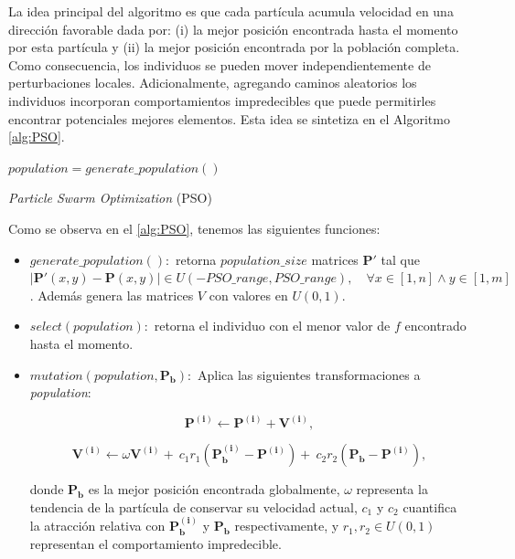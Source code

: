 La idea principal del algoritmo es que cada partícula acumula 
velocidad en una dirección favorable dada por: 
(i) la mejor posición encontrada hasta el momento por esta partícula y 
(ii) la mejor posición encontrada por la población completa.
Como consecuencia, los individuos se pueden mover independientemente de
perturbaciones locales.
Adicionalmente, agregando caminos aleatorios los individuos incorporan
comportamientos impredecibles que puede permitirles encontrar potenciales
mejores elementos. Esta idea se sintetiza en el Algoritmo \ref{alg:PSO}.

\begin{algorithm}
{}
$population = generate\_population()$ \\
\caption{\emph{Particle Swarm Optimization} (PSO)}
\label{alg:PSO}
\end{algorithm}

Como se observa en el \autoref{alg:PSO}, tenemos las siguientes funciones:

\begin{itemize}

    \item $generate\_population():$ 
      retorna $population\_size$ matrices 
      $\boldsymbol{P'}$ tal que 
      $|\boldsymbol{P'}(x, y) - \boldsymbol{P}(x, y)| \in U(-PSO\_range, PSO\_range), \quad \forall x \in [1, n]
      \land y \in [1, m]$. Además genera las matrices $V$ con valores en $U(0, 1)$.

\item $select(population):$ retorna el individuo con el menor valor de $f$ encontrado hasta el momento.

\item $mutation(population, \boldsymbol{P_b}):$ Aplica las siguientes transformaciones a \emph{population}: 
    
  \begin{equation}
    \boldsymbol{P^{(i)}} \gets \boldsymbol{P^{(i)}} + \boldsymbol{V^{(i)}},
  \label{pso-pos}
  \end{equation}

  \begin{equation}
    \boldsymbol{V^{(i)}} \gets \omega \boldsymbol{V^{(i)}} + \
                          c_1 r_1 \left(\boldsymbol{P_{b}^{(i)}} - \boldsymbol{P^{(i)}} \right) + \
                          c_2 r_2 \left(\boldsymbol{P_{b}} - \boldsymbol{P^{(i)}} \right),
  \label{pso-speed}
  \end{equation}
    

  donde $\boldsymbol{P_{b}}$  es la mejor posición encontrada globalmente, 
  $\omega$ representa la tendencia de la partícula de conservar su velocidad actual,
  $c_1$ y $c_2$ cuantifica la atracción relativa con $\boldsymbol{P_{b}^{(i)}}$ y 
  $\boldsymbol{P_{b}}$ respectivamente, 
  y $r_1, r_2 \in U(0, 1)$ representan el comportamiento impredecible.

\end{itemize}

